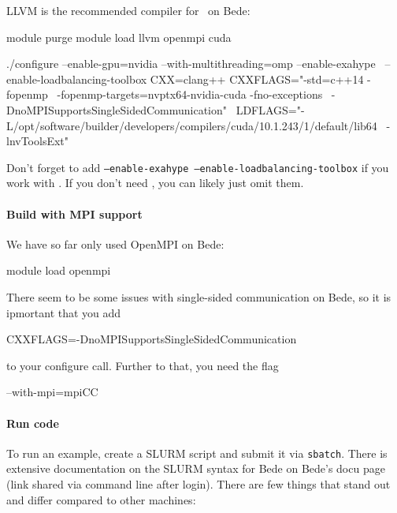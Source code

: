 LLVM is the recommended compiler for \Peano\ on Bede:

\begin{code}
module purge
module load llvm openmpi cuda

./configure --enable-gpu=nvidia --with-multithreading=omp --enable-exahype \  
  --enable-loadbalancing-toolbox CXX=clang++ CXXFLAGS="-std=c++14 -fopenmp \
  -fopenmp-targets=nvptx64-nvidia-cuda -fno-exceptions \
  -DnoMPISupportsSingleSidedCommunication"  \
  LDFLAGS="-L/opt/software/builder/developers/compilers/cuda/10.1.243/1/default/lib64 \ 
  -lnvToolsExt"
\end{code}


\noindent
Don't forget to add \texttt{--enable-exahype --enable-loadbalancing-toolbox} if
you work with \ExaHyPE.
If you don't need \ExaHyPE, you can likely just omit them.


\paragraph{Build with MPI support}

We have so far only used OpenMPI on Bede:
\begin{code}
module load openmpi
\end{code}

\noindent
There seem to be some issues with single-sided communication on Bede, so it is
ipmortant that you add

\begin{code}
CXXFLAGS=-DnoMPISupportsSingleSidedCommunication
\end{code}

\noindent
to your configure call. Further to that, you need the flag 
\begin{code}
--with-mpi=mpiCC
\end{code}


\paragraph{Run code}

To run an example, create a SLURM script and submit it via \texttt{sbatch}.
There is extensive documentation on the SLURM syntax for Bede on Bede's docu
page (link shared via command line after login).
There are few things that stand out and differ compared to other machines:


